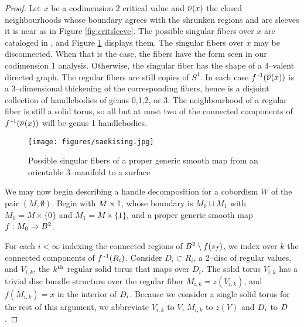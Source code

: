 \begin{proof}
	Let $x$ be a codimension 2 critical value and $\overline{\nu}(x)$ the closed neighbourhoods whose boundary agrees with the shrunken regions and arc sleeves it is near as in Figure \ref{fig:critsleeve}.
	The possible singular fibers over $x$ are cataloged in \cite{Saeki}, and Figure \ref{fig:saekising} displays them.
	The singular fibers over $x$ may be disconnected.
	When that is the case, the fibers have the form seen in our codimension 1 analysis.
	Otherwise, the singular fiber has the shape of a 4--valent directed graph.
	The regular fibers are still copies of $S^1$.
	In each case $f^{\,\text{-}1}(\overline{\nu}(x))$ is a 3--dimensional thickening of the corresponding fibers, hence is a disjoint collection of handlebodies of genus 0,1,2, or 3.
	The neighbourhood of a regular fiber is still a solid torus, so all but at most two of the connected components of $f^{\,\text{-}1}(\overline{\nu}(x))$ will be genus 1 handlebodies.
	
	\begin{figure}
		\centering
		\captionsetup{justification=centering}
		\caption{Possible singular fibers of a proper generic smooth map from an orientable 3--manifold to a surface}
		\texttt{[image: figures/saekising.jpg]}
		\label{fig:saekising}
	\end{figure}
	
	We may now begin describing a handle decomposition for a cobordism $W$ of the pair $(M,\emptyset)$.
	Begin with $M\times\mathbb{I}$, whose boundary is $M_0\sqcup M_1$ with $M_0=M\times\{0\}$ and $M_1 = M\times\{1\}$, and a proper generic smooth map $f:M_0\to B^2$.

	For each $i<\infty$ indexing the connected regions of $B^2\setminus f(s_f)$, we index over $k$ the connected components of $f^{\,\text{-}1}(R_i)$.
	Consider $D_i\subset R_i$, a 2--disc of regular values, and $V_{i,k}$, the $k^{\text{th}}$ regular solid torus that maps over $D_i$.
	The solid torus $V_{i,k}$ has a trivial disc bundle structure over the regular fiber $M_{i,k}=z(V_{i,k})$, and $f(M_{i,k})=x$ in the interior of $D_i$.
	Because we consider a single solid torus for the rest of this argument, we abbreviate $V_{i,k}$ to $V$, $M_{i,k}$ to $z(V)$ and $D_i$ to $D$.


\end{proof}
